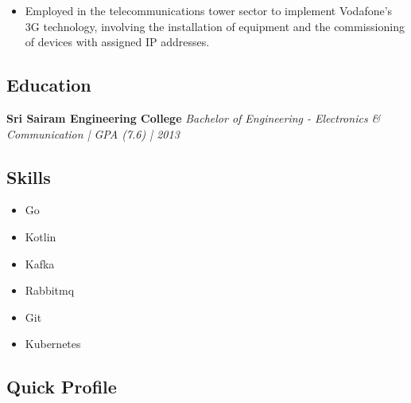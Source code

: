 \documentclass[11pt, oneside]{article}
\begin{document}
\begin{itemize}
  \item Employed in the telecommunications tower sector to implement Vodafone's 3G technology, involving the installation of equipment and the commissioning of devices with assigned IP addresses.

\end{itemize}

\medskip
\subsection*{Education}
\textbf{Sri Sairam Engineering College}
\hfill
\textit{Bachelor of Engineering - Electronics \& Communication | GPA (7.6) | 2013}

\medskip
\subsection*{Skills}
\begin{multicols}{3}
  \begin{itemize}
    \item Go
    \item Kotlin
    \item Kafka
    \item Rabbitmq
    \item Git
    \item Kubernetes
  \end{itemize}
\end{multicols}

\medskip
\subsection*{Quick Profile}
\begin{figure}[h!]
\centering
{}
\end{figure}
\end{document}
